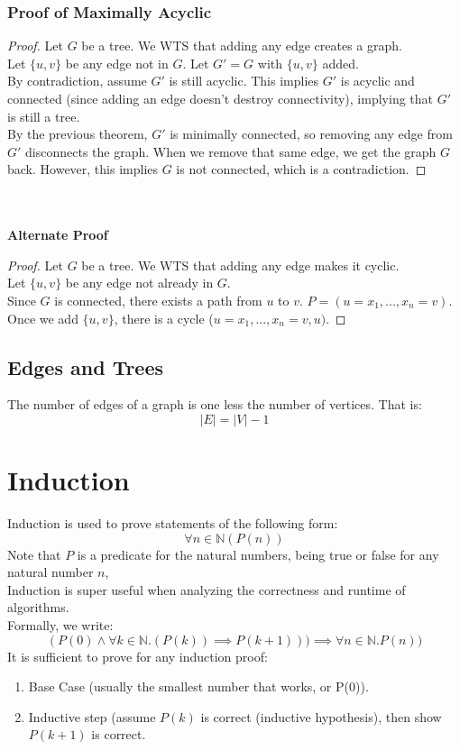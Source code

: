 \documentclass{article}
\begin{document}
\subsubsection{Proof of Maximally Acyclic}
\begin{proof}
Let $G$ be a tree. We WTS that adding any edge creates a graph.\\
Let $\{u,v\}$ be any edge not in $G$. Let $G' = G$ with $\{u,v\}$ added.\\
By contradiction, assume $G'$ is still acyclic.
This implies $G'$ is acyclic and connected (since adding an edge doesn't destroy connectivity), implying that $G'$ is still a tree.\\
By the previous theorem, $G'$ is minimally connected, so removing any edge from $G'$ disconnects the graph. When we remove that same edge, we get the graph $G$ back. However, this implies $G$ is not connected, which is a contradiction.
\end{proof}\\
\\
\textbf{Alternate Proof}
\begin{proof}
Let $G$ be a tree. We WTS that adding any edge makes it cyclic.\\
Let $\{u,v\}$ be any edge not already in $G$.\\
Since $G$ is connected, there exists a path from $u$ to $v$. $P = (u = x_1, ..., x_n = v)$. Once we add $\{u, v\}$, there is a cycle ($u = x_1, ..., x_n = v, u)$.
\end{proof}
\subsection{Edges and Trees}
The number of edges of a graph is one less the number of vertices. That is:
$$|E| = |V| - 1$$
\section{Induction}
Induction is used to prove statements of the following form:
$$\forall n \in \mathbb{N} (P(n))$$
Note that $P$ is a predicate for the natural numbers, being true or false for any natural number $n$,\\
Induction is super useful when analyzing the correctness and runtime of algorithms.\\
Formally, we write:
$$( P(0) \land \forall k \in \mathbb{N}. (P(k)) \implies P(k + 1))) \implies \forall n \in \mathbb{N}. P(n))$$
It is sufficient to prove for any induction proof:
\begin{enumerate}
    \item Base Case (usually the smallest number that works, or P(0)).
    \item Inductive step (assume $P(k)$ is correct (inductive hypothesis), then show $P(k + 1)$ is correct.
\end{enumerate}
\end{document}
